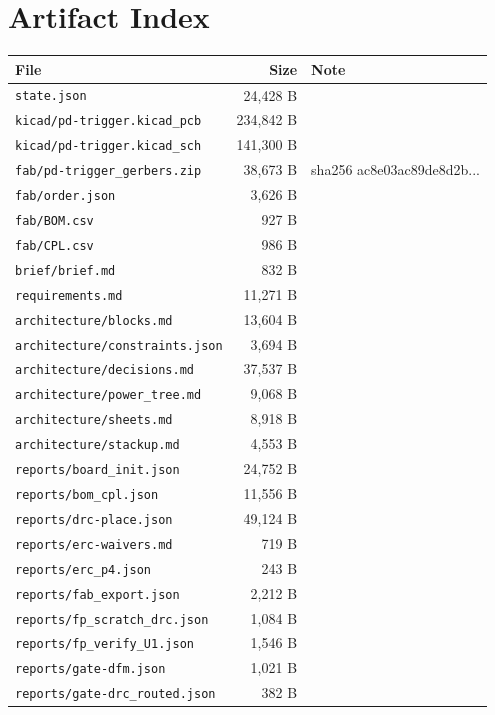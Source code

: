 \documentclass[11pt,a4paper]{article}
\begin{document}
\section{Artifact Index}
{\small
\begin{longtable}{p{9cm}rp{4cm}}
\toprule
\textbf{File} & \textbf{Size} & \textbf{Note} \\
\midrule
\endhead
\texttt{state.json} & 24,428 B &  \\
\texttt{kicad/pd-trigger.kicad\_pcb} & 234,842 B &  \\
\texttt{kicad/pd-trigger.kicad\_sch} & 141,300 B &  \\
\texttt{fab/pd-trigger\_gerbers.zip} & 38,673 B & sha256 ac8e03ac89de8d2b... \\
\texttt{fab/order.json} & 3,626 B &  \\
\texttt{fab/BOM.csv} & 927 B &  \\
\texttt{fab/CPL.csv} & 986 B &  \\
\texttt{brief/brief.md} & 832 B &  \\
\texttt{requirements.md} & 11,271 B &  \\
\texttt{architecture/blocks.md} & 13,604 B &  \\
\texttt{architecture/constraints.json} & 3,694 B &  \\
\texttt{architecture/decisions.md} & 37,537 B &  \\
\texttt{architecture/power\_tree.md} & 9,068 B &  \\
\texttt{architecture/sheets.md} & 8,918 B &  \\
\texttt{architecture/stackup.md} & 4,553 B &  \\
\texttt{reports/board\_init.json} & 24,752 B &  \\
\texttt{reports/bom\_cpl.json} & 11,556 B &  \\
\texttt{reports/drc-place.json} & 49,124 B &  \\
\texttt{reports/erc-waivers.md} & 719 B &  \\
\texttt{reports/erc\_p4.json} & 243 B &  \\
\texttt{reports/fab\_export.json} & 2,212 B &  \\
\texttt{reports/fp\_scratch\_drc.json} & 1,084 B &  \\
\texttt{reports/fp\_verify\_U1.json} & 1,546 B &  \\
\texttt{reports/gate-dfm.json} & 1,021 B &  \\
\texttt{reports/gate-drc\_routed.json} & 382 B &  \\

\end{longtable}}
\end{document}
